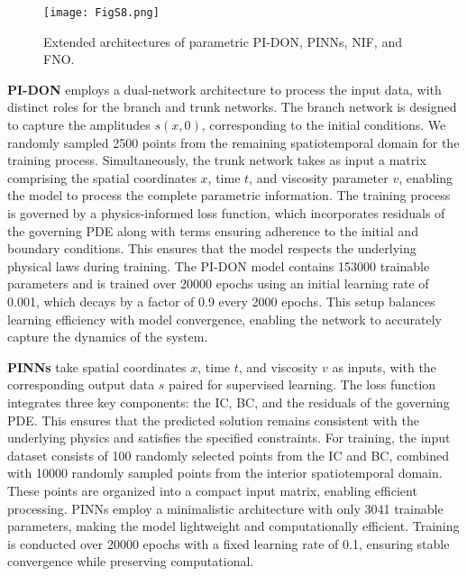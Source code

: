 \begin{figure}[!ht]
  \centering
  \texttt{[image: FigS8.png]}
  \caption{
  Extended architectures of parametric PI-DON, PINNs, NIF, and FNO.
  }
  \label{S8}
\end{figure}

\textbf{PI-DON} employs a dual-network architecture to process the input data, with distinct roles for the branch and trunk networks. The branch network is designed to capture the amplitudes $s(x, 0)$, corresponding to the initial conditions. We randomly sampled 2500 points from the remaining spatiotemporal domain for the training process. Simultaneously, the trunk network takes as input a matrix comprising the spatial coordinates $x$, time $t$, and viscosity parameter $v$, enabling the model to process the complete parametric information. The training process is governed by a physics-informed loss function, which incorporates residuals of the governing PDE along with terms ensuring adherence to the initial and boundary conditions. This ensures that the model respects the underlying physical laws during training. The PI-DON model contains 153000 trainable parameters and is trained over 20000 epochs using an initial learning rate of 0.001, which decays by a factor of 0.9 every 2000 epochs. This setup balances learning efficiency with model convergence, enabling the network to accurately capture the dynamics of the system.

\textbf{PINNs} take spatial coordinates $x$, time $t$, and viscosity $v$ as inputs, with the corresponding output data $s$ paired for supervised learning. The loss function integrates three key components: the IC, BC, and the residuals of the governing PDE. This ensures that the predicted solution remains consistent with the underlying physics and satisfies the specified constraints. For training, the input dataset consists of 100 randomly selected points from the IC and BC, combined with 10000 randomly sampled points from the interior spatiotemporal domain. These points are organized into a compact input matrix, enabling efficient processing. PINNs employ a minimalistic architecture with only 3041 trainable parameters, making the model lightweight and computationally efficient. Training is conducted over 20000 epochs with a fixed learning rate of 0.1, ensuring stable convergence while preserving computational.

